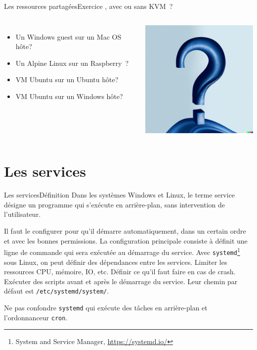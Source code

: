 \documentclass{beamer}
\begin{document}
    \begin{frame}{Les ressources partagées}{Exercice \execcounterdispinc{}, avec ou sans KVM~?}
        \begin{columns}
            \begin{itemize}
                \item Un Windows guest sur un Mac OS hôte?
                \item Un Alpine Linux sur un Raspberry\footnotemark~?
                \item VM Ubuntu sur un Ubuntu hôte?
                \item VM Ubuntu sur un Windows hôte?
            \end{itemize}
            \centering
            \includegraphics[width=6cm]{image/question-mark-on-a-blank-background}
        \end{columns}
    \end{frame}


    \section{Les services}\label{sec:les-services}

    \begin{frame}{Les services}{Définition}
        Dans les systèmes Windows et Linux, le terme service désigne un programme qui s'exécute en arrière-plan, sans intervention de l'utilisateur.

        Il faut le configurer pour qu'il démarre automatiquement, dans un certain ordre et avec les bonnes permissions.
        \bigbreak
        La configuration principale consiste à définit une ligne de commande qui sera exécutée au démarrage du service.
        \bigbreak
        Avec \lstinline{systemd}\footnote{System and Service Manager, \url{https://systemd.io/}} sous Linux, on peut définir des dépendances entre les services.
        Limiter les ressources CPU, mémoire, IO, etc.
        Définir ce qu'il faut faire en cas de crash.
        Exécuter des scripts avant et après le démarrage du service.
        \bigbreak
        Leur chemin par défaut est \lstinline{/etc/systemd/system/}.
        \begin{dangercolorbox}
            Ne pas confondre \lstinline{systemd} qui exécute des tâches en arrière-plan et l'ordonnanceur \lstinline{cron}.
        \end{dangercolorbox}
    \end{frame}
\end{document}
